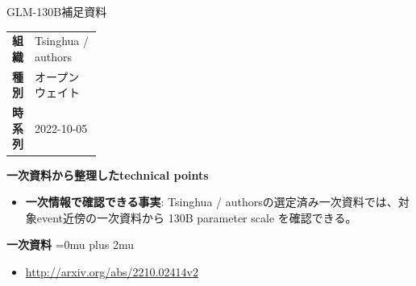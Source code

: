 \begin{technicalnote}{GLM-130B}{補足資料}
\begingroup
\begin{tabularx}{\linewidth}{@{}>{\bfseries}p{0.22\linewidth}X@{}}
組織 & Tsinghua / authors \\
種別 & オープンウェイト \\
時系列 & 2022-10-05 \\
\end{tabularx}
\smallskip
{\bfseries 一次資料から整理したtechnical points}
\begin{itemize}[leftmargin=1.5em,itemsep=0.35em]
\item \textbf{一次情報で確認できる事実}: Tsinghua / authorsの選定済み一次資料では、対象event近傍の一次資料から 130B parameter scale を確認できる。
\end{itemize}
\begin{minipage}{\linewidth}
\begin{samepage}
{\bfseries 一次資料}
\begingroup\sloppy
\Urlmuskip=0mu plus 2mu\relax
\begin{itemize}[leftmargin=1.5em,itemsep=0.25em]
\item {\scriptsize\url{http://arxiv.org/abs/2210.02414v2}}
\end{itemize}
\endgroup
\end{samepage}
\end{minipage}
\endgroup
\end{technicalnote}
\medskip
